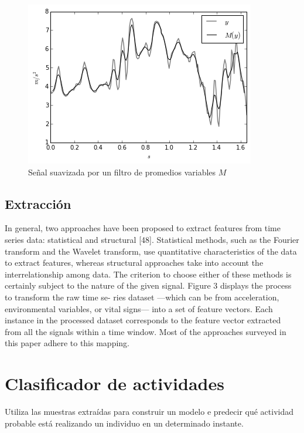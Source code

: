 \begin{figure}[!tbph]
\begin{centering}
\includegraphics{capitulo-4/graphics/moving_average}
\par\end{centering}
\caption[Señal suavizada por la función $M$]{\label{fig4:filter-maf}Señal suavizada por un filtro de promedios
variables $M$}

\end{figure}


\subsection{Extracción}

\label{ssec44:extraction}In general, two approaches have been proposed
to extract features from time series data: statistical and structural
{[}48{]}. Statistical methods, such as the Fourier transform and the
Wavelet transform, use quantitative characteristics of the data to
extract features, whereas structural approaches take into account
the interrelationship among data. The criterion to choose either of
these methods is certainly subject to the nature of the given signal.
Figure 3 displays the process to transform the raw time se- ries dataset
—which can be from acceleration, environmental variables, or vital
signs— into a set of feature vectors. Each instance in the processed
dataset corresponds to the feature vector extracted from all the signals
within a time window. Most of the approaches surveyed in this paper
adhere to this mapping.

\section{Clasificador de actividades}

\label{sec45:clasificador}Utiliza las muestras extraídas para construir
un modelo e predecir qué actividad probable está realizando un individuo
en un determinado instante.

